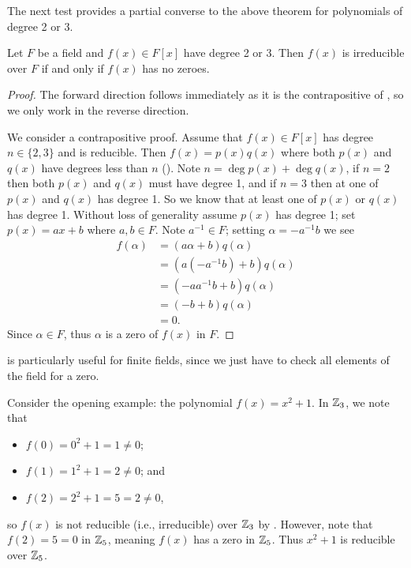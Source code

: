 The next test provides a partial converse to the above theorem for polynomials of degree 2 or 3.
\begin{theorem}\label{thrm-degree-2-or-3-irreducible-iff-has-no-zeroes}
    Let $F$ be a field and $f(x) \in F[x]$ have degree 2 or 3. Then $f(x)$ is irreducible over $F$ if and only if $f(x)$ has no zeroes.
\end{theorem}
\begin{proof}
    The forward direction follows immediately as it is the contrapositive of , so we only work in the reverse direction.

    We consider a contrapositive proof. Assume that $f(x) \in F[x]$ has degree $n \in \{2, 3\}$ and is reducible. Then $f(x) = p(x)q(x)$ where both $p(x)$ and $q(x)$ have degrees less than $n$ (). Note $n = \deg p(x) + \deg q(x)$, if $n = 2$ then both $p(x)$ and $q(x)$ must have degree 1, and if $n = 3$ then at one of $p(x)$ and $q(x)$ has degree 1. So we know that at least one of $p(x)$ or $q(x)$ has degree 1. Without loss of generality assume $p(x)$ has degree 1; set $p(x) = ax + b$ where $a,b \in F$. Note $a^{-1} \in F$; setting $\alpha = -a^{-1}b$ we see
    \begin{align*}
        f(\alpha) &= (a\alpha+b)q(\alpha)\\
        &= \left(a\left(-a^{-1}b\right) + b\right)q(\alpha)\\
        &= \left(-aa^{-1}b + b\right)q(\alpha)\\
        &= (-b+b)q(\alpha)\\
        &= 0.
    \end{align*}
    Since $\alpha \in F$, thus $\alpha$ is a zero of $f(x)$ in $F$.
\end{proof}

 is particularly useful for finite fields, since we just have to check all elements of the field for a zero.

\begin{example}
    Consider the opening example: the polynomial $f(x) = x^2 + 1$. In $\mathbb{Z}_3$, we note that
    \begin{itemize}
        \item $f(0) = 0^2 + 1 = 1 \neq 0$;
        \item $f(1) = 1^2 + 1 = 2 \neq 0$; and
        \item $f(2) = 2^2 + 1 = 5 = 2 \neq 0$,
    \end{itemize}
    so $f(x)$ is not reducible (i.e., irreducible) over $\mathbb{Z}_3$ by . However, note that $f(2) = 5 = 0$ in $\mathbb{Z}_5$, meaning $f(x)$ has a zero in $\mathbb{Z}_5$. Thus $x^2 + 1$ is reducible over $\mathbb{Z}_5$.
\end{example}

